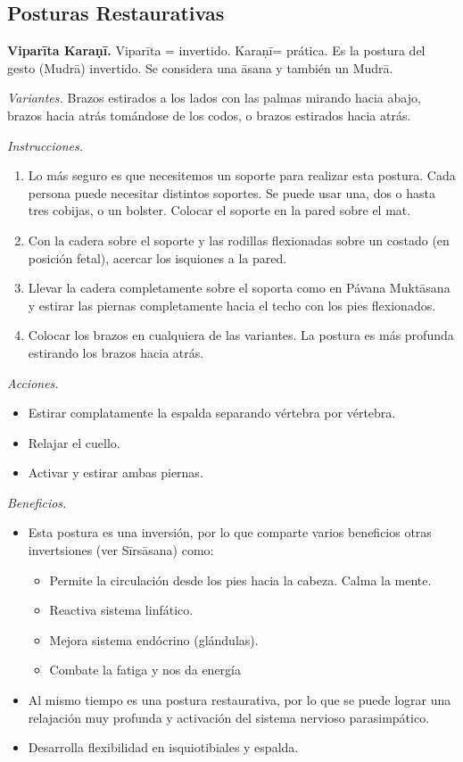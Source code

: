 \subsection{Posturas Restaurativas}
\label{section-posturas-restaurativas}

\medskip\noindent\textbf{Viparīta Karaṇī.}
Viparīta = invertido. Karaṇī= prática. Es la
postura del gesto (Mudrā) invertido. Se
considera una āsana y también un Mudrā.

\emph{Variantes.} Brazos estirados a los
lados con las palmas mirando hacia abajo,
brazos hacia atrás tomándose de los codos, o
brazos estirados hacia atrás.

\emph{Instrucciones.}
\begin{enumerate}
\item Lo más seguro es que necesitemos un
soporte para realizar esta postura. Cada
persona puede necesitar distintos soportes.
Se puede usar una, dos o hasta tres cobijas,
o un bolster. Colocar el soporte en la pared
sobre el mat.
\item Con la cadera sobre el soporte y las
rodillas flexionadas sobre un costado (en
posición fetal), acercar los isquiones a la
pared.
\item Llevar la cadera completamente sobre el
soporta como en Pávana Muktāsana y estirar
las piernas completamente hacia el techo con
los pies flexionados.
\item Colocar los brazos en cualquiera de las
variantes. La postura es más profunda
estirando los brazos hacia atrás.
\end{enumerate}

\emph{Acciones.}
\begin{itemize}
\item Estirar complatamente la espalda
separando vértebra por vértebra.
\item Relajar el cuello.
\item Activar y estirar ambas piernas.
\end{itemize}

\emph{Beneficios.}
\begin{itemize}
\item Esta postura es una inversión, por lo
que comparte varios beneficios otras
invertsiones (ver Sīrsāsana) como:
\begin{itemize}
\item Permite la circulación desde los pies
hacia la cabeza. Calma la mente.
\item Reactiva sistema linfático.
\item Mejora sistema endócrino (glándulas).
\item Combate la fatiga y nos da energía
\end{itemize}
\item Al mismo tiempo es una postura
restaurativa, por lo que se puede lograr una
relajación muy profunda y activación del
sistema nervioso parasimpático.
\item Desarrolla flexibilidad en
isquiotibiales y espalda.
\end{itemize}

